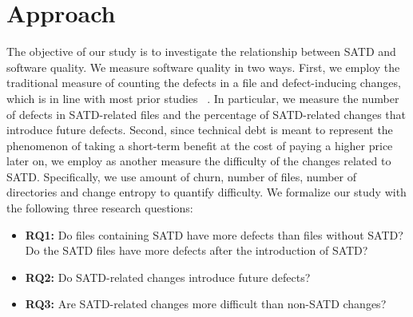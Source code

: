 
\section{Approach}
\label{chap3:sec:approach}

The objective of our study is to investigate the relationship between SATD and software quality. We measure software quality in two ways. First, we employ the traditional measure of counting the defects in a file and defect-inducing changes, which is in line with most prior studies ~\cite{Kamei-tse-2013,Kim-tse-2008,sliwerski-msr-2005}. In particular, we measure the number of defects in SATD-related files and the percentage of SATD-related changes that introduce future defects. Second, since technical debt is meant to represent the phenomenon of taking a short-term benefit at the cost of paying a higher price later on, we employ as another measure the difficulty of the changes related to SATD. Specifically, we use amount of churn, number of files, number of directories and change entropy to quantify difficulty. We formalize our study with the following three research questions:


\begin{itemize}
	\vspace{0.2cm}
	\item {\bf RQ1:} Do files containing SATD have more defects than files without SATD? Do the SATD files have more defects after the introduction of SATD?\\
	\item {\bf RQ2:} Do SATD-related changes introduce future defects?\\
	\item {\bf RQ3:} Are SATD-related changes more difficult than non-SATD changes?
\end{itemize}


